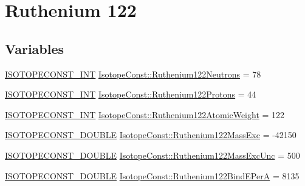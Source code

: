 \hypertarget{group___isotope_const-_ruthenium-_ru122}{}\section{Ruthenium 122}
\label{group___isotope_const-_ruthenium-_ru122}
\subsection*{Variables}
\begin{DoxyCompactItemize}
\item 
\mbox{\hyperlink{group___isotope_const-_macros_ga5f18360b3e99483a35c32d789e62621c}{I\+S\+O\+T\+O\+P\+E\+C\+O\+N\+S\+T\+\_\+\+I\+NT}} \mbox{\hyperlink{group___isotope_const-_ruthenium-_ru122_gafa0ec53d8f5fa953424c51aa8b0a177c}{Isotope\+Const\+::\+Ruthenium122\+Neutrons}} = 78
\item 
\mbox{\hyperlink{group___isotope_const-_macros_ga5f18360b3e99483a35c32d789e62621c}{I\+S\+O\+T\+O\+P\+E\+C\+O\+N\+S\+T\+\_\+\+I\+NT}} \mbox{\hyperlink{group___isotope_const-_ruthenium-_ru122_gac3e146f9105812b4cddc8fb8bd471435}{Isotope\+Const\+::\+Ruthenium122\+Protons}} = 44
\item 
\mbox{\hyperlink{group___isotope_const-_macros_ga5f18360b3e99483a35c32d789e62621c}{I\+S\+O\+T\+O\+P\+E\+C\+O\+N\+S\+T\+\_\+\+I\+NT}} \mbox{\hyperlink{group___isotope_const-_ruthenium-_ru122_gab1e0ea777b65be15668cccafe8f3283e}{Isotope\+Const\+::\+Ruthenium122\+Atomic\+Weight}} = 122
\item 
\mbox{\hyperlink{group___isotope_const-_macros_ga8f45a7272ce02c0b4c65c44636ed719a}{I\+S\+O\+T\+O\+P\+E\+C\+O\+N\+S\+T\+\_\+\+D\+O\+U\+B\+LE}} \mbox{\hyperlink{group___isotope_const-_ruthenium-_ru122_gab2a74561f09593c1d55b3e04b59c9fbe}{Isotope\+Const\+::\+Ruthenium122\+Mass\+Exc}} = -\/42150
\item 
\mbox{\hyperlink{group___isotope_const-_macros_ga8f45a7272ce02c0b4c65c44636ed719a}{I\+S\+O\+T\+O\+P\+E\+C\+O\+N\+S\+T\+\_\+\+D\+O\+U\+B\+LE}} \mbox{\hyperlink{group___isotope_const-_ruthenium-_ru122_ga7d0ca95cf4055f7f403c6b2295a77ed4}{Isotope\+Const\+::\+Ruthenium122\+Mass\+Exc\+Unc}} = 500
\item 
\mbox{\hyperlink{group___isotope_const-_macros_ga8f45a7272ce02c0b4c65c44636ed719a}{I\+S\+O\+T\+O\+P\+E\+C\+O\+N\+S\+T\+\_\+\+D\+O\+U\+B\+LE}} \mbox{\hyperlink{group___isotope_const-_ruthenium-_ru122_ga0a99e48fd0a802158a20614cbc25337b}{Isotope\+Const\+::\+Ruthenium122\+Bind\+E\+PerA}} = 8135
\item 

\end{DoxyCompactItemize}
